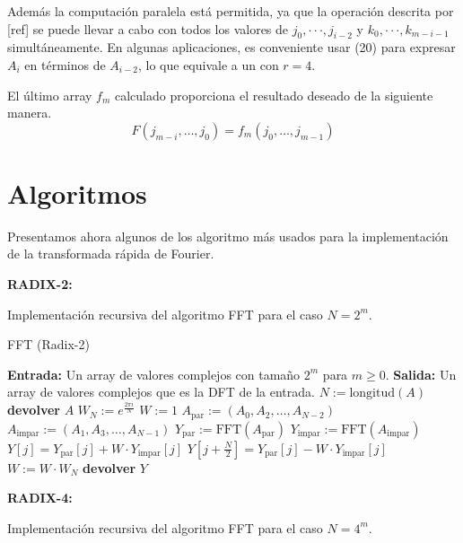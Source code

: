\noindent Además la computación paralela está permitida, ya que la operación descrita por [ref] se puede llevar a cabo con todos los valores de \(j_0, \cdot \cdot \cdot, j_{i-2}\) y \(k_0, \cdot \cdot \cdot, k_{m-i-1}\) simultáneamente. En algunas aplicaciones, es conveniente usar (20) para expresar \(A_i\) en términos de \(A_{i-2}\), lo que equivale a un  con \(r = 4\).

\noindent El último array $f_m$ calculado proporciona el resultado deseado de la siguiente manera.
\[ F(j_{m-i}, \ldots, j_0) = f_{m} (j_{0}, \ldots, j_{m-1}) \]




\section{Algoritmos}
Presentamos ahora algunos de los algoritmo más usados para la implementación de la transformada rápida de Fourier.

\textbf{RADIX-2:}

Implementación recursiva del  algoritmo FFT para el caso $N=2^m$.

\begin{algorithm}
\caption{FFT (Radix-2)}
\label{alg:fft}
\begin{algorithmic}[1]
    \State \textbf{Entrada:} Un array de valores complejos con tamaño $2^m$ para $m \geq 0$.
    \State \textbf{Salida:} Un array de valores complejos que es la DFT de la entrada.
    \State $N := \text{longitud}(A)$
        \State \textbf{devolver} $A$
    \Else
        \State $W_N := e^{\frac{2\pi i}{N}}$
        \State $W := 1$
        \State $A_{\text{par}} := (A_0, A_2, \ldots, A_{N-2})$
        \State $A_{\text{impar}} := (A_1, A_3, \ldots, A_{N-1})$
        \State $Y_{\text{par}} := \text{FFT}(A_{\text{par}})$
        \State $Y_{\text{impar}} := \text{FFT}(A_{\text{impar}})$
            \State $Y[j] = Y_{\text{par}}[j] + W \cdot Y_{\text{impar}}[j]$
            \State $Y[j + \frac{N}{2}] = Y_{\text{par}}[j] - W \cdot Y_{\text{impar}}[j]$
            \State $W := W \cdot W_N$
        \EndFor
        \State \textbf{devolver} $Y$
    \EndIf
\EndProcedure
\end{algorithmic}
\end{algorithm}



\textbf{RADIX-4:}

Implementación recursiva del  algoritmo FFT para el caso $N=4^m$.









